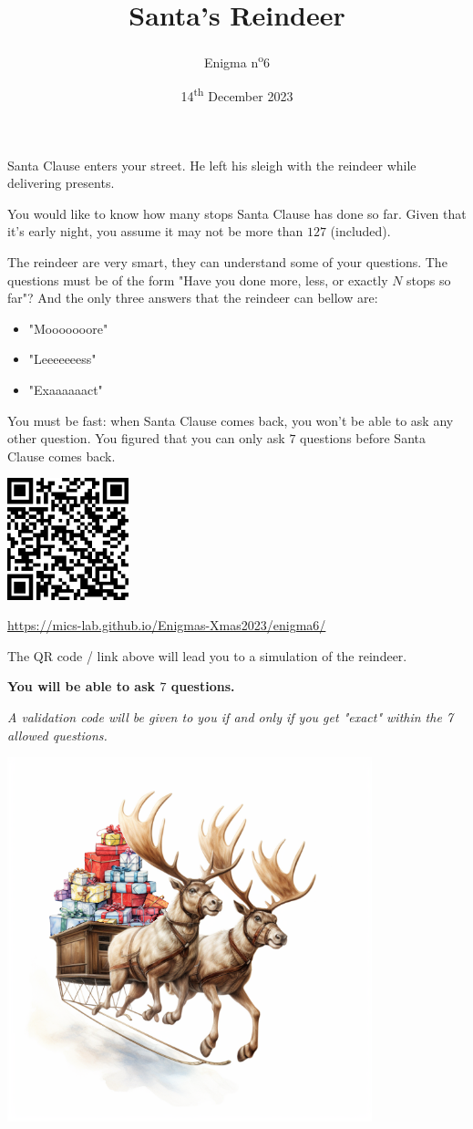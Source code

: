 \documentclass[a4paper, top=10mm]{article}
\title{\textbf{\huge{Santa's Reindeer}}}
\author{Enigma n\textsuperscript{o}6}
\date{14\textsuperscript{th} December 2023}
\begin{document}
	\maketitle
	
	Santa Clause enters your street.
	He left his sleigh with the reindeer while delivering presents.
	
	You would like to know how many stops Santa Clause has done so far.
	Given that it's early night, you assume it may not be more than $127$ (included).
	
	The reindeer are very smart, they can understand some of your questions.
	The questions must be of the form "Have you done more, less, or exactly $N$ stops so far"?
	And the only three answers that the reindeer can bellow are:
	\begin{itemize}
		\item "Mooooooore"
		\item "Leeeeeeess"
		\item "Exaaaaaact"
	\end{itemize}
	You must be fast: when Santa Clause comes back, you won't be able to ask any other question.
	You figured that you can only ask $7$ questions before Santa Clause comes back.
	
	\begin{center}
		\includegraphics[height=100pt]{06QR.png}
		
		\url{https://mics-lab.github.io/Enigmas-Xmas2023/enigma6/}
	\end{center}
	
	The QR code / link above will lead you to a simulation of the reindeer.
	
	\textbf{You will be able to ask $7$ questions.}
	
	\textit{A validation code will be given to you if and only if you get "exact" within the 7 allowed questions.}
	
	\begin{center}
		\includegraphics[height=300pt]{06sleigh_with_presents.png}
	\end{center}
	
\end{document}

